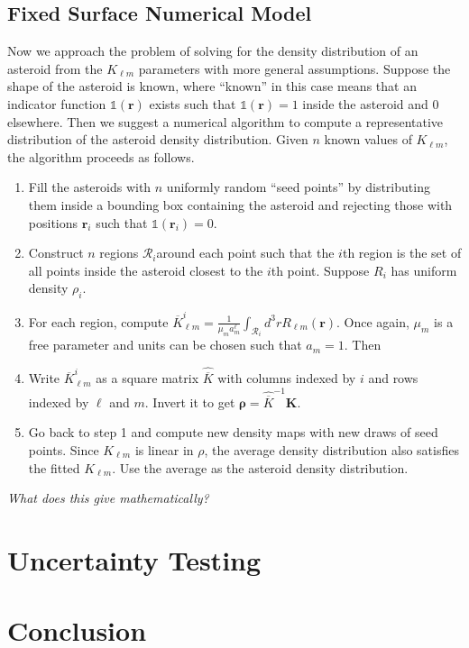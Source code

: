 \documentclass[11pt]{article}
\newcommand{\jtd}[1]{{\color{red}\textit{#1}}}
\begin{document}
\subsection{Fixed Surface Numerical Model}
Now we approach the problem of solving for the density distribution of an asteroid from the $K_{\ell m}$ parameters with more general assumptions. Suppose the shape of the asteroid is known, where ``known'' in this case means that an indicator function $\mathbb{1}(\bm r)$ exists such that $\mathbb{1}(\bm r) = 1$  inside the asteroid and 0 elsewhere. Then we suggest a numerical algorithm to compute a representative distribution of the asteroid density distribution. Given $n$ known values of $K_{\ell m}$, the algorithm proceeds as follows.
\begin{enumerate}
\item Fill the asteroids with $n$ uniformly random ``seed points'' by distributing them inside a bounding box containing the asteroid and rejecting those with positions $\bm r_i$ such that $\mathbb{1}(\bm r_i) = 0.$
\item Construct $n$ regions $\mathcal{R}_i$around each point such that the $i$th region is the set of all points inside the asteroid closest to the $i$th point. Suppose $R_i$ has uniform density $\rho_i$.
\item For each region, compute $\overline K_{\ell m}^i = \frac{1}{\mu_m a_m^\ell}\int_{\mathcal{R}_i} d^3 r R_{\ell m}(\bm r)$. Once again, $\mu_m$ is a free parameter and units can be chosen such that $a_m=1$. Then %
\item Write $\overline K_{\ell m}^i$ as a square matrix $\hat{\overline K}$ with columns indexed by $i$ and rows indexed by $\ell$ and $m$. Invert it to get $\bm \rho = \hat {\overline K}^{-1} \bm K$.
\item Go back to step 1 and compute new density maps with new draws of seed points. Since $K_{\ell m}$ is linear in $\rho$, the average density distribution also satisfies the fitted $K_{\ell m}$. Use the average as the asteroid density distribution.
\end{enumerate}

\jtd{What does this give mathematically?}



\section{Uncertainty Testing}


\section{Conclusion}



\end{document}
